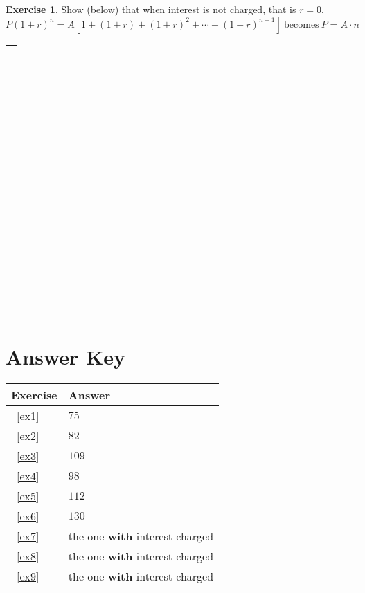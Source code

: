 \documentclass[12pt,letterpaper]{amsart}
\theoremstyle{definition} %
\newtheorem{xca}[theorem]{Exercise}
\begin{document}
\begin{xca}\label{ex10}Show (below) that when interest is not charged, that is $r=0$,
$$P(1+r)^n=A[1+(1+r)+(1+r)^2+\cdots+(1+r)^{n-1}]\mathrm{\ becomes\ }P=A\cdot n$$
\begin{table}[ht]\begin{tabular}[center]{|l|}
\hline
\color{white}\rule{6.5in}{1pt}\\
\color{white}\rule{6.5in}{1pt}\\
\color{white}\rule{6.5in}{1pt}\\
\color{white}\rule{6.5in}{1pt}\\
\color{white}\rule{6.5in}{1pt}\\
\color{white}\rule{6.5in}{1pt}\\
\color{white}\rule{6.5in}{1pt}\\
\color{white}\rule{6.5in}{1pt}\\
\color{white}\rule{6.5in}{1pt}\\
\color{white}\rule{6.5in}{1pt}\\
\hline\end{tabular}\end{table}\end{xca}

\vfill
\pagebreak

\section{Answer Key}
\begin{table}[ht]\begin{tabular}[center]{l|l}
\hline\hline
Exercise	&	Answer\\
\hline
~\ref{ex1}	&	$75$\\
~\ref{ex2}	&	$82$\\
~\ref{ex3}	&	$109$\\
~\ref{ex4}	&	$98$\\
~\ref{ex5}	&	$112$\\
~\ref{ex6}	&	$130$\\
~\ref{ex7}	&	the one \textbf{with} interest charged\\
~\ref{ex8}	&	the one \textbf{with} interest charged\\
~\ref{ex9}	&	the one \textbf{with} interest charged\\
\hline\end{tabular}\end{table}

\vfill
\end{document}
